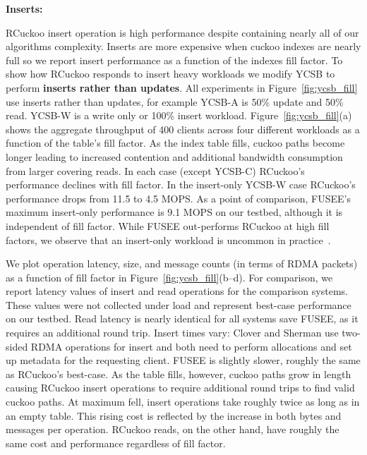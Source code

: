 \textbf{Inserts:}

RCuckoo insert operation is high performance despite
containing nearly all of our algorithms complexity. Inserts
are more expensive when cuckoo indexes are nearly full so we
report insert performance as a function of the indexes fill
factor. To show how RCuckoo responds to insert heavy
workloads we modify YCSB to perform \textbf{inserts rather
than updates}. All experiments in Figure~\ref{fig:ycsb_fill}
use inserts rather than updates, for example YCSB-A is 50\%
update and 50\% read. YCSB-W is a write only or 100\% insert
workload.
Figure~\ref{fig:ycsb_fill}(a) shows the aggregate throughput
of 400 clients across four different workloads as a function
of the table's fill factor.  As the index table fills,
cuckoo paths become longer leading to increased contention
and additional bandwidth consumption from larger covering
reads. In each case (except YCSB-C) RCuckoo's performance
declines with fill factor. In the insert-only YCSB-W case
RCuckoo's performance drops from 11.5 to 4.5 MOPS.  As a
point of comparison, FUSEE's maximum insert-only performance
is 9.1 MOPS on our testbed, although it is independent of
fill factor.  While FUSEE out-performs RCuckoo at high fill
factors, we observe that an insert-only workload is uncommon
in practice~\cite{facebook-memcached}.

We plot operation latency, size, and message counts (in
terms of RDMA packets) as a function of fill factor in
Figure~\ref{fig:ycsb_fill}(b--d).  For comparison, we report
latency values of insert and read operations for the
comparison systems. These values were not collected under
load and represent best-case performance on our testbed.
Read latency is nearly identical for all systems save FUSEE,
as it requires an additional round trip.  Insert times vary:
Clover and Sherman use two-sided RDMA operations for insert
and both need to perform allocations and set up metadata for
the requesting client.  FUSEE is slightly slower, roughly
the same as RCuckoo's best-case.  As the table fills,
however, cuckoo paths grow in length causing RCuckoo insert
operations to require additional round trips to find valid
cuckoo paths.  At maximum fell, insert operations take
roughly twice as long as in an empty table. This rising cost
is reflected by the increase in both bytes and messages per
operation.  RCuckoo reads, on the other hand, have roughly
the same cost and performance regardless of fill factor.



